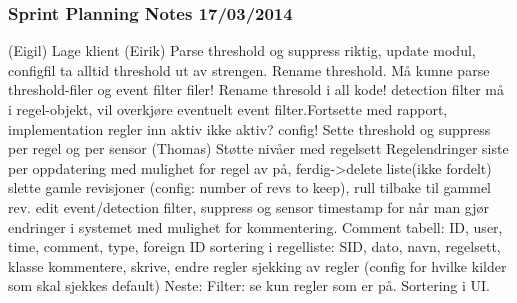\subsubsection{Sprint Planning Notes 17/03/2014}

(Eigil)\newline
Lage klient\newline
(Eirik)\newline
Parse threshold og suppress riktig, update modul, configfil ta alltid threshold
ut av strengen.\newline
Rename threshold. Må kunne parse threshold-filer og event filter filer! Rename
thresold i all kode! detection filter må i regel-objekt, vil overkjøre
eventuelt event filter.\newline Fortsette med rapport, implementation\newline
regler inn aktiv ikke aktiv? config!\newline
Sette threshold og suppress per regel og per sensor\newline
(Thomas)\newline
Støtte nivåer med regelsett \newline
Regelendringer siste per oppdatering med mulighet for regel av på,
ferdig->delete liste\newline (ikke fordelt)\newline
slette gamle revisjoner (config: number of revs to keep), rull tilbake til
gammel rev.\newline
edit event/detection filter, suppress og sensor\newline
timestamp for når man gjør endringer i systemet med mulighet for kommentering.
\newline
Comment tabell: ID, user, time, comment, type, foreign ID\newline
sortering i regelliste: SID, dato, navn, regelsett, klasse\newline
kommentere, skrive, endre regler \newline
sjekking av regler (config for hvilke kilder som skal sjekkes default)\newline
Neste:\newline
Filter: se kun regler som er på.\newline
Sortering i UI.\newline
